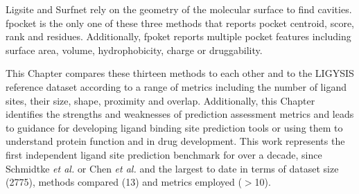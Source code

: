 Ligsite \cite{HENDLICH_1997_LIGSITE} and Surfnet \cite{LASKOWSKI_1995_SURFNET} rely on the geometry of the molecular surface to find cavities. fpocket is the only one of these three methods that reports pocket centroid, score, rank and residues. Additionally, fpoket reports multiple pocket features including surface area, volume, hydrophobicity, charge or druggability. 

This Chapter compares these thirteen methods to each other and to the LIGYSIS reference dataset according to a range of metrics including the number of ligand sites, their size, shape, proximity and overlap. Additionally, this Chapter identifies the strengths and weaknesses of prediction assessment metrics and leads to guidance for developing ligand binding site prediction tools or using them to understand protein function and in drug development. This work represents the first independent ligand site prediction benchmark for over a decade, since Schmidtke \textit{et al.} \cite{SCHMIDTKE_2010_BENCHMARK} or Chen \textit{et al.} \cite{CHEN_2011_ASSESSMENT} and the largest to date in terms of dataset size (2775), methods compared (13) and metrics employed ($>$10).

